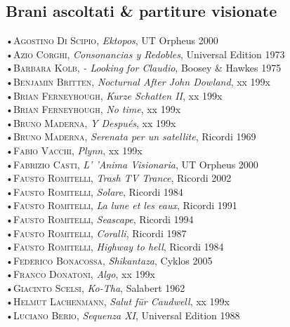 \documentclass[oneside]{article}
\begin{document}
\begin{multicols*}{2}
\section{ Brani ascoltati \& partiture visionate}
•\textsc{\textsf {Agostino Di Scipio}}, \emph{Ektopos}, UT Orpheus 2000\\
•\textsc{\textsf {Azio Corghi}}, \emph{Consonancias y Redobles}, Universal Edition 1973\\
•\textsc{\textsf {Barbara Kolb}}, \emph{ - Looking for Claudio}, Boosey \& Hawkes 1975\\
•\textsc{\textsf {Benjamin Britten}}, \emph{Nocturnal After John Dowland}, xx 199x\\
•\textsc{\textsf {Brian Ferneyhough}}, \emph{Kurze Schatten II}, xx 199x\\
•\textsc{\textsf {Brian Ferneyhough}}, \emph{No time}, xx 199x\\
•\textsc{\textsf {Bruno Maderna}}, \emph{Y Después}, xx 199x\\
•\textsc{\textsf {Bruno Maderna}}, \emph{Serenata per un satellite}, Ricordi 1969\\
•\textsc{\textsf {Fabio Vacchi}}, \emph{Plynn}, xx 199x\\
•\textsc{\textsf {Fabrizio Casti}}, \emph{ L' 'Anima Visionaria}, UT Orpheus 2000\\
•\textsc{\textsf {Fausto Romitelli}}, \emph{Trash TV Trance}, Ricordi 2002\\
•\textsc{\textsf {Fausto Romitelli}}, \emph{Solare}, Ricordi 1984\\
•\textsc{\textsf {Fausto Romitelli}}, \emph{La lune et les eaux}, Ricordi 1991\\
•\textsc{\textsf {Fausto Romitelli}}, \emph{Seascape}, Ricordi 1994\\
•\textsc{\textsf {Fausto Romitelli}}, \emph{Coralli}, Ricordi 1987\\
•\textsc{\textsf {Fausto Romitelli}}, \emph{Highway to hell}, Ricordi 1984\\
•\textsc{\textsf {Federico Bonacossa}}, \emph{Shikantaza}, Cyklos 2005\\
•\textsc{\textsf {Franco Donatoni}}, \emph{Algo}, xx 199x\\
•\textsc{\textsf {Giacinto Scelsi}}, \emph{Ko-Tha}, Salabert 1962\\
•\textsc{\textsf {Helmut Lachenmann}}, \emph{Salut für Caudwell}, xx 199x\\
•\textsc{\textsf {Luciano Berio}}, \emph{Sequenza XI}, Universal Edition 1988\\

\end{multicols*}
\end{document}
